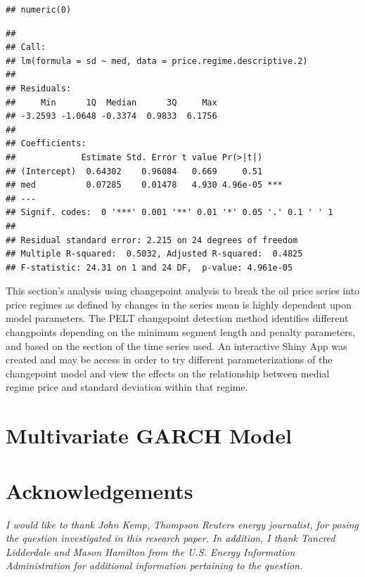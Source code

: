 \documentclass[11pt,]{article}
\begin{document}
\begin{verbatim}
## numeric(0)
\end{verbatim}

\begin{verbatim}
## 
## Call:
## lm(formula = sd ~ med, data = price.regime.descriptive.2)
## 
## Residuals:
##     Min      1Q  Median      3Q     Max 
## -3.2593 -1.0648 -0.3374  0.9833  6.1756 
## 
## Coefficients:
##             Estimate Std. Error t value Pr(>|t|)    
## (Intercept)  0.64302    0.96084   0.669     0.51    
## med          0.07285    0.01478   4.930 4.96e-05 ***
## ---
## Signif. codes:  0 '***' 0.001 '**' 0.01 '*' 0.05 '.' 0.1 ' ' 1
## 
## Residual standard error: 2.215 on 24 degrees of freedom
## Multiple R-squared:  0.5032, Adjusted R-squared:  0.4825 
## F-statistic: 24.31 on 1 and 24 DF,  p-value: 4.961e-05
\end{verbatim}

This section's analysis using changepoint analysis to break the oil
price series into price regimes as defined by changes in the series mean
is highly dependent upon model parameters. The PELT changepoint
detection method identifies different changpoints depending on the
minimum segment length and penalty parameters, and based on the section
of the time series used. An interactive Shiny App was created and may be
access in order to try different parameterizations of the changepoint
model and view the effects on the relationship between medial regime
price and standard deviation within that regime.

\section{Multivariate GARCH Model}\label{multivariate-garch-model}

\section{Acknowledgements}\label{acknowledgements}

\emph{I would like to thank John Kemp, Thompson Reuters energy
journalist, for posing the question investigated in this research paper.
In addition, I thank Tancred Lidderdale and Mason Hamilton from the U.S.
Energy Information Administration for additional information pertaining
to the question.}
\end{document}
